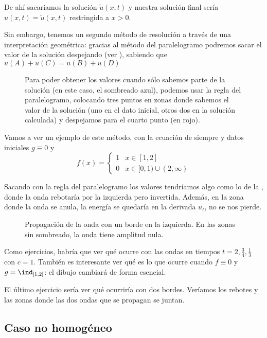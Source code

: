 		De ahí sacaríamos la solución $\tilde{u}(x,t)$ y nuestra solución final sería $u(x,t) = \tilde{u}(x,t)$ restringida a $x > 0$.

		Sin embargo, tenemos un segundo método de resolución a través de una interpretación geométrica: gracias al método del paralelogramo podremos sacar el valor de la solución despejando (ver ), sabiendo que \( u(A) + u(C) = u(B) + u(D) \label{eq:Onda:Paralelogramo} \)

		\begin{figure}[hbtp]
		\caption{Para poder obtener los valores cuando sólo sabemos parte de la solución (en este caso, el sombreado azul), podemos usar la regla del paralelogramo, colocando tres puntos en zonas donde sabemos el valor de la solución (uno en el dato inicial, otros dos en la solución calculada) y despejamos para el cuarto punto (en rojo).}
		\label{fig:AplicacionParalelogramo}
		\end{figure}

		Vamos a ver un ejemplo de este método, con la ecuación de siempre y datos iniciales $g \equiv 0$ y \[ f(x) = \begin{cases} 1 & x ∈ [1,2] \\ 0 & x ∈ [0,1) ∪ (2,∞) \end{cases} \]

		Sacando con la regla del paralelogramo los valores tendríamos algo como lo de la , donde la onda rebotaría por la izquierda pero invertida. Además, en la zona donde la onda se anula, la energía se quedaría en la derivada $u_t$, no se nos pierde.

		\begin{figure}[hbtp]
		\centering
		\caption{Propagación de la onda con un borde en la izquierda. En las zonas sin sombreado, la onda tiene amplitud nula.}
		\label{fig:OndaReflexion}
		\end{figure}


		Como ejercicios, habría que ver qué ocurre con las ondas en tiempos $t = 2, \frac{3}{4}, \frac{1}{3}$ con $c = 1$. También es interesante ver qué es lo que ocurre cuando $f \equiv 0$ y $g = \ind_{[1,2]}$: el dibujo cambiará de forma esencial.

		El último ejercicio sería ver qué ocurriría con dos bordes. Veríamos los rebotes y las zonas donde las dos ondas que se propagan se juntan.

		\subsection{Caso no homogéneo}
		\label{sec:Onda:NoHomogeneo}

